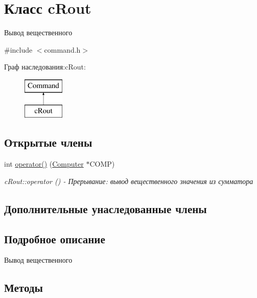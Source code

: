 \hypertarget{classc_rout}{}\section{Класс c\+Rout}
\label{classc_rout}


Вывод вещественного  




{\ttfamily \#include $<$command.\+h$>$}

Граф наследования\+:c\+Rout\+:\begin{figure}[H]
\begin{center}
\leavevmode
\includegraphics[height=2.000000cm]{classc_rout}
\end{center}
\end{figure}
\subsection*{Открытые члены}
\begin{DoxyCompactItemize}
\item 
int \hyperlink{classc_rout_a25d1eb608870665eccbf6beb529d8999}{operator()} (\hyperlink{class_computer}{Computer} $\ast$C\+O\+MP)
\begin{DoxyCompactList}\small\item\em c\+Rout\+::operator () -\/ Прерывание\+: вывод вещественного значения из сумматора \end{DoxyCompactList}\end{DoxyCompactItemize}
\subsection*{Дополнительные унаследованные члены}


\subsection{Подробное описание}
Вывод вещественного 

\subsection{Методы}
\hypertarget{classc_rout_a25d1eb608870665eccbf6beb529d8999}{}\label{classc_rout_a25d1eb608870665eccbf6beb529d8999} 
